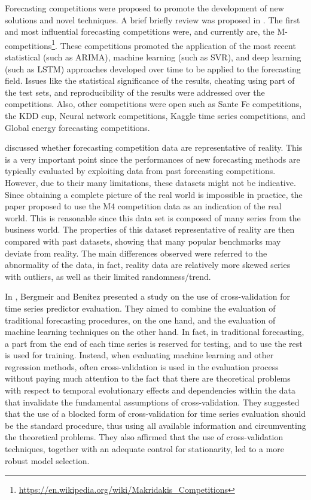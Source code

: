 Forecasting competitions were proposed to promote the development of new solutions and novel techniques.
A brief briefly review was proposed in \cite{HYNDMAN20207}.
The first and most influential forecasting competitions were, and currently are, the M-competitions\footnote{ \url{https://en.wikipedia.org/wiki/Makridakis_Competitions} }.
These competitions promoted the application of the most recent statistical (such as ARIMA), machine learning (such as SVR), and deep learning (such as LSTM) approaches developed over time to be applied to the forecasting field.
Issues like the statistical significance of the results, cheating using part of the test sets, and reproducibility of the results were addressed over the competitions.
Also, other competitions were open such as Sante Fe competitions, the KDD cup, Neural network competitions, Kaggle time series competitions, and Global energy forecasting competitions.

\cite{SPILIOTIS202037} discussed whether forecasting competition data are representative of reality.
This is a very important point since the performances of new forecasting methods are typically evaluated by exploiting data from past forecasting competitions.
However, due to their many limitations, these datasets might not be indicative.
Since obtaining a complete picture of the real world is impossible in practice, the paper proposed to use the M4 competition data as an indication of the real world.
This is reasonable since this data set is composed of many series from the business world.
The properties of this dataset representative of reality are then compared with past datasets, showing that many popular benchmarks may deviate from reality.
The main differences observed were referred to the abnormality of the data, in fact, reality data are relatively more skewed series with outliers, as well as their limited randomness\slash trend.

In \cite{BERGMEIR2012192}, Bergmeir and Benítez presented a study on the use of cross-validation for time series predictor evaluation.
They aimed to combine the evaluation of traditional forecasting procedures, on the one hand, and the evaluation of machine learning techniques on the other hand.
In fact, in traditional forecasting, a part from the end of each time series is reserved for testing, and to use the rest is used for training.
Instead, when evaluating machine learning and other regression methods, often cross-validation is used in the evaluation process without paying much attention to the fact that there are theoretical problems with respect to temporal evolutionary effects and dependencies within the data that invalidate the fundamental assumptions of cross-validation.
They suggested that the use of a blocked form of cross-validation for time series evaluation should be the standard procedure, thus using all available information and circumventing the theoretical problems.
They also affirmed that the use of cross-validation techniques, together with an adequate control for stationarity, led to a more robust model selection.


